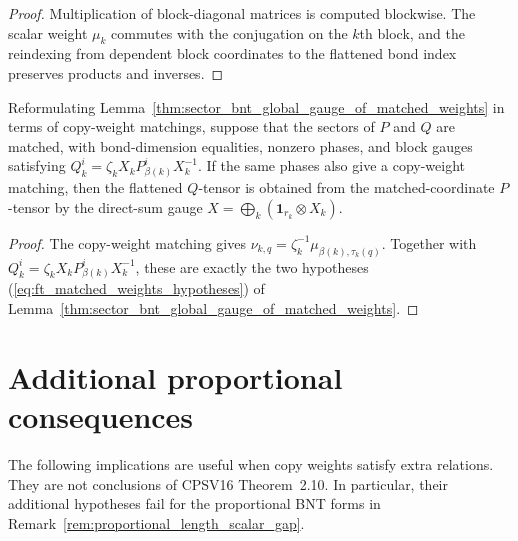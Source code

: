 \begin{proof}\leanok
    Multiplication of block-diagonal matrices is computed blockwise. The scalar
    weight $\mu_k$ commutes with the conjugation on the $k$th block, and the
    reindexing from dependent block coordinates to the flattened bond index
    preserves products and inverses.
\end{proof}

\begin{lemma}%
    \label{thm:sector_bnt_global_gauge_of_copy_weight_matching}
    \leanok
    Reformulating Lemma~\ref{thm:sector_bnt_global_gauge_of_matched_weights}
    in terms of copy-weight matchings, suppose that the sectors of $P$ and $Q$
    are matched, with bond-dimension equalities, nonzero phases, and block
    gauges satisfying $Q_k^i=\zeta_k X_kP_{\beta(k)}^iX_k^{-1}$. If the same
    phases also give a copy-weight matching, then the flattened $Q$-tensor is
    obtained from the matched-coordinate $P$-tensor by the direct-sum gauge
    $X=\bigoplus_k(\mathbf{1}_{r_k}\otimes X_k)$.
\end{lemma}

\begin{proof}\leanok
    The copy-weight matching gives
    $\nu_{k,q}=\zeta_k^{-1}\mu_{\beta(k),\tau_k(q)}$. Together with
    $Q_k^i=\zeta_kX_kP_{\beta(k)}^iX_k^{-1}$, these are exactly the two
    hypotheses (\ref{eq:ft_matched_weights_hypotheses}) of
    Lemma~\ref{thm:sector_bnt_global_gauge_of_matched_weights}.
\end{proof}


\section{Additional proportional consequences}
\label{sec:app_ft_conditional_proportional}

The following implications are useful when copy weights satisfy extra
relations. They are not conclusions of CPSV16 Theorem~2.10. In particular,
their additional hypotheses fail for the proportional BNT forms in
Remark~\ref{rem:proportional_length_scalar_gap}.

